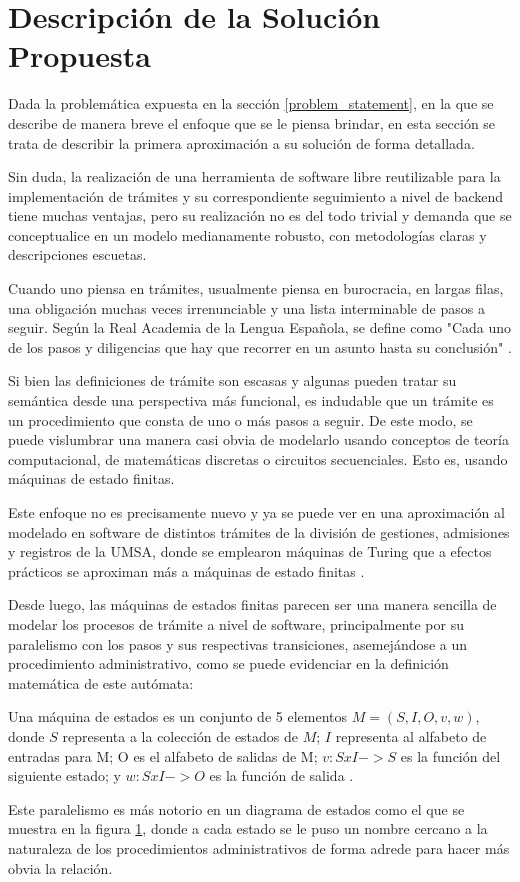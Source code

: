 \section{Descripción de la Solución Propuesta}
Dada la problemática expuesta en la sección \ref{problem_statement}, en la que se
describe de manera breve el enfoque que se le piensa brindar, en esta sección se
trata de describir la primera aproximación a su solución de forma detallada.

Sin duda, la realización de una herramienta de software libre reutilizable para la
implementación de trámites y su correspondiente seguimiento a nivel de backend tiene
muchas ventajas, pero su realización no es del todo trivial y demanda que se
conceptualice en un modelo medianamente robusto, con metodologías claras y descripciones
escuetas.

Cuando uno piensa en trámites, usualmente piensa en burocracia, en largas filas,
una obligación muchas veces irrenunciable y una lista interminable de pasos a
seguir. Según la Real Academia de la Lengua Española, se define como "Cada uno de
los pasos y diligencias que hay que recorrer en un asunto hasta su conclusión"
\parencite{asaleDiccionarioLenguaEspanola}.

Si bien las definiciones de trámite son escasas y algunas pueden tratar su semántica
desde una perspectiva más funcional, es indudable que un trámite es un
procedimiento que consta de uno o más pasos a seguir. De este modo, se puede
vislumbrar una manera casi obvia de modelarlo usando conceptos de teoría
computacional, de matemáticas discretas o circuitos secuenciales. Esto es, usando
máquinas de estado finitas.

Este enfoque no es precisamente nuevo y ya se puede ver en una aproximación al modelado
en software de distintos trámites de la división de gestiones, admisiones y
registros de la UMSA, donde se emplearon máquinas de Turing que a efectos prácticos
se aproximan más a máquinas de estado finitas \parencite{nachoSISTEMACONTROLTRAMITES2007}.

Desde luego, las máquinas de estados finitas parecen ser una manera sencilla de modelar
los procesos de trámite a nivel de software, principalmente por su paralelismo
con los pasos y sus respectivas transiciones, asemejándose a un procedimiento administrativo,
como se puede evidenciar en la definición matemática de este autómata:

\begin{definition}
	Una máquina de estados es un conjunto de 5 elementos $M=(S,I,O,v,w)$, donde
	$S$ representa a la colección de estados de $M$; $I$ representa al alfabeto de
	entradas para M; O es el alfabeto de salidas de M; $v:SxI->S$ es la función del
	siguiente estado; y $w:SxI->O$ es la función de salida \parencite{grimaldiDiscreteCombinatorialMathematics1998}.
\end{definition}

Este paralelismo es más notorio en un diagrama de estados como el que se muestra
en la figura \ref{}, donde a cada estado se le puso un nombre cercano a la
naturaleza de los procedimientos administrativos de forma adrede para hacer más
obvia la relación.